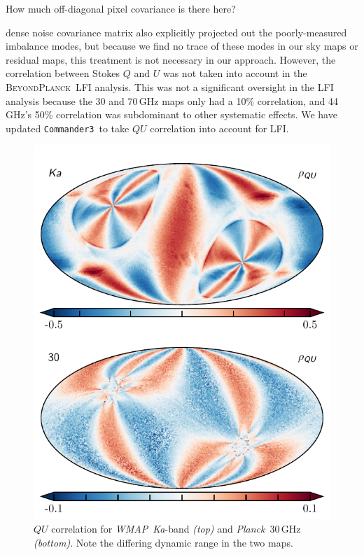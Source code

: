 \documentclass[twocolumn]{../../common/aa}
\def\WMAP{\emph{WMAP}}
\def\Planck{\emph{Planck}}
\def\commanderthree{\texttt{Commander3}}
\newcommand{\BP}{\textsc{BeyondPlanck}}
\newcommand{\Ka}[0]{\textit{Ka}}
\begin{document}
How much off-diagonal pixel covariance is there here?

dense noise covariance matrix also explicitly projected out the poorly-measured imbalance modes, but because we find no trace of these modes in our sky maps or residual maps, this treatment is not necessary in our approach. However, the correlation between Stokes $Q$ and $U$ was not taken into account in the \BP\ LFI analysis. This was not a significant oversight in the LFI analysis because the 30 and 70\,GHz maps only had a 10\% correlation, and 44\,GHz's 50\% correlation was subdominant to other systematic effects. We have updated \commanderthree\ to take $QU$ correlation into account for LFI.

\begin{figure}
	\includegraphics[width=\columnwidth]{figures/rho_QU.pdf}
	\caption{$QU$ correlation for \WMAP\ \Ka-band \textit{(top)} and \Planck\ 30\,GHz \textit{(bottom)}. Note the differing dynamic range in the two maps.}
	\label{fig:rho_qu}
\end{figure}
\end{document}
